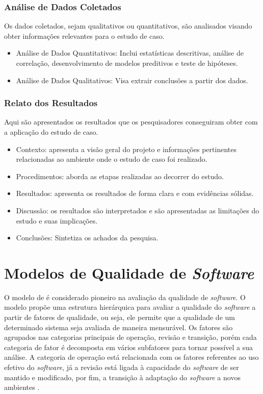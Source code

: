 \subsubsection{Análise de Dados Coletados}

Os dados coletados, sejam qualitativos ou quantitativos, são analisados visando obter informações relevantes para o estudo de caso.  

\begin{itemize}
    \item Análise de Dados Quantitativos: Inclui estatísticas descritivas, análise de correlação, desenvolvimento de modelos preditivos e teste de hipóteses.
    \item Análise de Dados Qualitativos: Visa extrair conclusões a partir dos dados.
  \end{itemize}


\subsubsection{Relato dos Resultados}

Aqui são apresentados os resultados que os pesquisadores conseguiram obter com a aplicação do estudo de caso. 

\begin{itemize}
    \item Contexto: apresenta a visão geral do projeto e informações pertinentes relacionadas ao ambiente onde o estudo de caso foi realizado.
    \item Procedimentos: aborda as etapas realizadas ao decorrer do estudo.
    \item Resultados: apresenta os resultados de forma clara e com evidências sólidas.
    \item Discussão: os resultados são interpretados e são apresentadas as limitações do estudo e suas implicações.
    \item Conclusões: Sintetiza os achados da pesquisa.
  \end{itemize}
  
\section{Modelos de Qualidade de \textit{Software}}
 
O modelo de  é considerado pioneiro na avaliação da qualidade de \textit{software}. O modelo propõe uma estrutura hierárquica para avaliar a qualidade do \textit{software} a partir de fatores de qualidade, ou seja, ele permite que a qualidade de um determinado sistema seja avaliada de maneira mensurável. 
Os fatores são agrupados nas categorias principais de operação, revisão e transição, porém cada categoria de fator é decomposta em vários subfatores para tornar possível a sua análise. A categoria de operação está relacionada com os fatores referentes ao uso efetivo do \textit{software}, já a revisão está ligada à capacidade do \textit{software} de ser mantido e modificado, por fim, a transição à adaptação do \textit{software} a novos ambientes \cite{McCall1977}.

